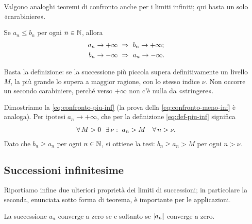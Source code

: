 Valgono analoghi teoremi di confronto anche per i limiti infiniti; qui basta un solo
«carabiniere».

\begin{teorema}\label{teo:confronto-infinito}
Se $a_{n}\le b_{n}$ per ogni $n\in\mathbb{N}$, allora
\begin{align}
  a_{n}\to+\infty &\ \Rightarrow\ b_{n}\to+\infty; \label{eq:confronto-piu-inf}\\
  b_{n}\to-\infty &\ \Rightarrow\ a_{n}\to-\infty. \label{eq:confronto-meno-inf}
\end{align}
\end{teorema}

\begin{schema}
\end{schema}

\begin{strategia}
Basta la definizione: se la successione più piccola supera definitivamente un livello
$M$, la più grande lo supera a maggior ragione, con lo stesso indice $\nu$. Non occorre
un secondo carabiniere, perché verso $+\infty$ non c'è nulla da «stringere».
\end{strategia}

\begin{dimostrazione}
Dimostriamo la \eqref{eq:confronto-piu-inf} (la prova della \eqref{eq:confronto-meno-inf}
è analoga). Per ipotesi $a_{n}\to+\infty$, che per la definizione
\eqref{eq:def-piu-inf} significa
\begin{equation}\label{eq:confronto-inf-passo}
  \forall\, M>0\ \ \exists\,\nu :\ a_{n}>M \quad\forall\, n>\nu .
\end{equation}
Dato che $b_{n}\ge a_{n}$ per ogni $n\in\mathbb{N}$, si ottiene la tesi:
$b_{n}\ge a_{n}>M$ per ogni $n>\nu$.
\end{dimostrazione}

\subsection{Successioni infinitesime}

Riportiamo infine due ulteriori proprietà dei limiti di successioni; in particolare la
seconda, enunciata sotto forma di teorema, è importante per le applicazioni.

\begin{proposizione}\label{prop:infinitesima-modulo}
La successione $a_{n}$ converge a zero se e soltanto se $\lvert a_{n}\rvert$ converge a zero.
\end{proposizione}

